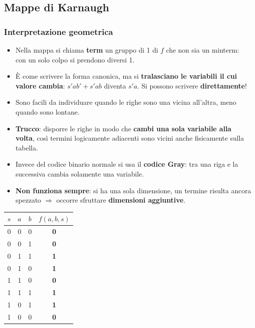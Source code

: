 \documentclass[12pt, a4paper]{article}
\begin{document}
\subsection{Mappe di Karnaugh}

\subsubsection{Interpretazione geometrica}
\begin{itemize}
    \item Nella mappa si chiama \textbf{term} un gruppo di 1 di $f$ che non sia un minterm: con un solo colpo si prendono diversi 1.
    \item È come scrivere la forma canonica, ma si \textbf{tralasciano le variabili il cui valore cambia}: $s'ab' + s'ab$ diventa $s'a$. Si possono scrivere \textbf{direttamente}!
    \item Sono facili da individuare quando le righe sono una vicina all'altra, meno quando sono lontane.
    \item \textbf{Trucco}: disporre le righe in modo che \textbf{cambi una sola variabile alla volta}, così termini logicamente adiacenti sono vicini anche fisicamente sulla tabella.
    \item Invece del codice binario normale si usa il \textbf{codice Gray}: tra una riga e la successiva cambia solamente una variabile.
    \item \textcolor{red!80!black}{\textbf{Non funziona sempre}}: si ha una sola dimensione, un termine risulta ancora spezzato $\Rightarrow$ occorre sfruttare \textbf{dimensioni aggiuntive}.
\end{itemize}

\begin{center}
\renewcommand{\arraystretch}{1.25}
\begin{tabular}[t]{|ccc||c|}
\hline
\colorbox{gray!25}{\color{black}$s$} & \colorbox{gray!25}{\color{black}$a$} & \colorbox{gray!25}{\color{black}$b$} & \colorbox{gray!25}{\color{black}$f(a,b,s)$} \\ \hline
0 & 0 & 0 & \textbf{0} \\ \hline
0 & 0 & 1 & \textbf{0} \\ \hline
0 & 1 & 1 & \textbf{1} \\ \hline
0 & 1 & 0 & \textbf{1} \\ \hline
1 & 1 & 0 & \textbf{0} \\ \hline
1 & 1 & 1 & \textbf{1} \\ \hline
1 & 0 & 1 & \textbf{1} \\ \hline
1 & 0 & 0 & \textbf{0} \\ \hline
\end{tabular}
\end{center}
\end{document}
